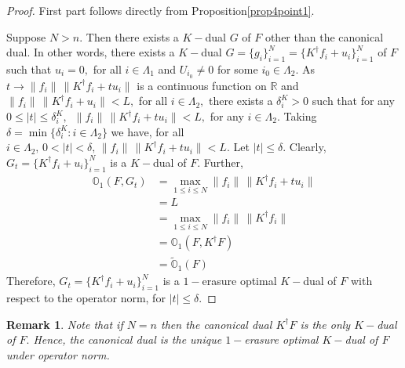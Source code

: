 \documentclass[final,1p,times]{elsarticle}
\newtheorem{rem}[thm]{Remark}
\begin{document}
\begin{proof}
	First part follows directly from Proposition\ref{prop4point1}.
	\par  Suppose $N>n.$ Then there exists a $K-$dual $G$ of $F$ other than the canonical dual. In other words, there exists a $K-$dual $G=\{g_i\}_{i=1}^N = \{K^\dag f_i +u_i\}_{i=1}^N$ of $F$ such that $u_i = 0,$ for all $i \in \Lambda_1$ and $U_{i_0} \neq 0$ for some $i_0 \in \Lambda_2.$ As $t \to \|f_i\|\,\|K^\dag f_i + tu_i\|$ is a  continuous  function on $\mathbb{R}$ and $\|f_i\|\,\|K^\dag f_i + u_i\|<L,$ for all $i \in \Lambda_2,$ there exists a $\delta_{i}^K>0$ such that for any $0 \leq |t| \leq \delta_{i}^K,\,$ $\|f_i\|\,\|K^\dag f_i + t u_i\| < L,$ for any $i \in \Lambda_2.$ Taking $\delta= \min \{\delta_{i}^K : i \in \Lambda_2\}$ we have, for all $i \in \Lambda_2,\,0 <  |t| < \delta,\,\|f_i\|\,\|K^\dag f_i + t u_i\| < L.$ Let $|t| \leq \delta.$ Clearly, $G_t = \{K^\dag f_i +u_i\}_{i=1}^N$ is a $K-$dual of $F.$ Further,
	\begin{align*}
		\mathbb{O}_{1} (F, G_t) &= \max_{1\leq i \leq N} \|f_i\|\,\|K^\dag f_i + t u_i\| \\&= L \\&=  \max_{1\leq i \leq N} \|f_i\|\,\|K^\dag f_i \| \\&= 	\mathbb{O}_{1} (F, K^\dag F) \\&=	\widetilde{\mathbb{O}}_{1} (F)
	\end{align*}
	Therefore, $G_t = \{K^\dag f_i +u_i\}_{i=1}^N$ is a $1-$erasure optimal $K-$dual of $F$  with respect to the operator norm, for $|t| \leq \delta.$
\end{proof}

\begin{rem}
    Note that if $N=n$ then the canonical dual $K^\dag F$ is the only $K-$dual of $F.$  Hence, the canonical dual is the unique $1-$erasure optimal $K-$dual of $F$ under operator norm.
\end{rem}
\end{document}
